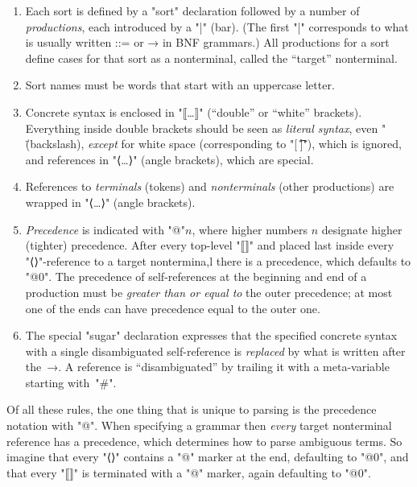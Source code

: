 \documentclass[11pt]{article} %
\begin{document}
\begin{notation}\leavevmode
  \begin{enumerate}

  \item Each sort is defined by a "sort" declaration followed by a number of \emph{productions},
    each introduced by a "|" (bar). (The first "|" corresponds to what is usually written ::= or →
    in BNF grammars.)  All productions for a sort define cases for that sort as a nonterminal,
    called the ``target'' nonterminal.

  \item Sort names must be words that start with an uppercase letter.

  \item Concrete syntax is enclosed in "⟦…⟧" (``double'' or ``white'' brackets). Everything inside
    double brackets should be seen as \emph{literal syntax}, even "\" (backslash), \emph{except} for
    \HAX white space (corresponding to "[\ \t\n\r]"), which is ignored, and references in "⟨…⟩" (angle
    brackets), which are special.

  \item References to \emph{terminals} (tokens) and \emph{nonterminals} (other productions) are
    wrapped in "⟨…⟩" (angle brackets).

  \item \emph{Precedence} is indicated with "@"$n$, where higher numbers $n$ designate higher
    (tighter) precedence. After every top-level "⟦⟧" and placed last inside every "⟨⟩"-reference to
    a target nontermina,l there is a precedence, which defaults to "@0".  The precedence of
    self-references at the beginning and end of a production must be \emph{greater than or equal to}
    the outer precedence; at most one of the ends can have precedence equal to the outer one.

  \item The special "sugar" declaration expresses that the specified concrete syntax with a single
    disambiguated self-reference is \emph{replaced} by what is written after the~→. A reference is
    ``disambiguated'' by trailing it with a meta-variable starting with~"#".

  \end{enumerate}
  Of all these rules, the one thing that is unique to parsing is the precedence notation with "@".
  When specifying a grammar then \emph{every} target nonterminal reference has a precedence, which
  determines how to parse ambiguous terms. So imagine that every "⟨⟩" contains a "@" marker at the
  end, defaulting to "@0", and that every "⟦⟧" is terminated with a "@" marker, again defaulting to
  "@0".
\end{notation}
\end{document}
